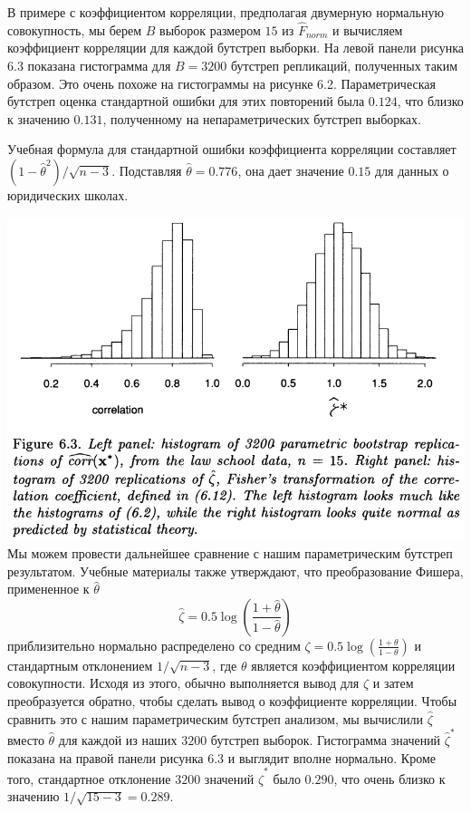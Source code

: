В примере с коэффициентом корреляции, предполагая двумерную нормальную совокупность, мы берем $B$ выборок размером $15$ из $\hat F_{norm}$ и вычисляем коэффициент корреляции для каждой бутстреп выборки. На левой панели рисунка 6.3 показана гистограмма для $B = 3200$ бутстреп репликаций, полученных таким образом. Это очень похоже на гистограммы на рисунке 6.2. Параметрическая бутстреп оценка стандартной ошибки для этих повторений была $0.124$, что близко к значению $0.131$, полученному на непараметрических бутстреп выборках.

Учебная формула для стандартной ошибки коэффициента корреляции составляет $(1-\hat\theta^2) / \sqrt{n- 3}$. Подставляя $\hat\theta = 0.776$, она дает значение $0.15$ для данных о юридических школах.
\newline

\noindent
\includegraphics[width=\linewidth]{5/f63.png}
\newline
Мы можем провести дальнейшее сравнение с нашим параметрическим бутстреп результатом. Учебные материалы также утверждают, что преобразование Фишера, примененное к $\hat\theta$
\begin{equation}
    \hat\zeta=0.5\log\left(\frac{1+\hat\theta}{1-\hat\theta}\right)
\end{equation}
приблизительно нормально распределено со средним $\zeta= 0.5  \log\left(\frac{1+\theta}{1-\theta}\right)$ и стандартным отклонением $1 / \sqrt{n-3}$, где $\theta$ является коэффициентом корреляции совокупности. Исходя из этого, обычно выполняется вывод для $\zeta$ и затем преобразуется обратно, чтобы сделать вывод о коэффициенте корреляции. Чтобы сравнить это с нашим параметрическим бутстреп анализом, мы вычислили $\hat\zeta$ вместо $\hat\theta$ для каждой из наших $3200$ бутстреп выборок. Гистограмма значений $\hat\zeta^*$ показана на правой панели рисунка 6.3 и выглядит вполне нормально. Кроме того, стандартное отклонение $3200$ значений $\hat\zeta^*$ было $0.290$, что очень близко к значению $1 / \sqrt{15-3} = 0.289$. 

